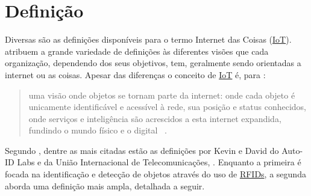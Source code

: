 \documentclass[twoside,english,brazilian]{UNISINOSmonografia}
\begin{document}
\section{Definição}

	Diversas são as definições disponíveis para o termo Internet das 
	Coisas (\hyperref[siglas]{IoT}).  atribuem a grande variedade de 
	definições às diferentes visões que cada organização, dependendo dos 
	seus objetivos, tem, geralmente sendo orientadas a internet ou as 
	coisas. Apesar das diferenças o conceito de \hyperref[siglas]{IoT} é, para 
	:
	
	\begin{quote}
		uma visão onde objetos se tornam parte da internet: onde cada 
		objeto é unicamente identificável e acessível à rede, sua posição 
		e status conhecidos, onde serviços e inteligência são acrescidos a 
		esta internet expandida, fundindo o mundo físico e o digital~
		\cite{Coetzee2011}.
	\end{quote}
	
	Segundo , dentre as mais citadas estão as 
	definições por Kevin  e David 
	 do Auto-ID Labs e da União Internacional de 
	Telecomunicações, . Enquanto a primeira é focada na 
	identificação e detecção de objetos através do uso de \hyperref[siglas]{RFIDs}, a segunda 
	aborda uma definição mais ampla, detalhada a seguir.
	
\end{document}
